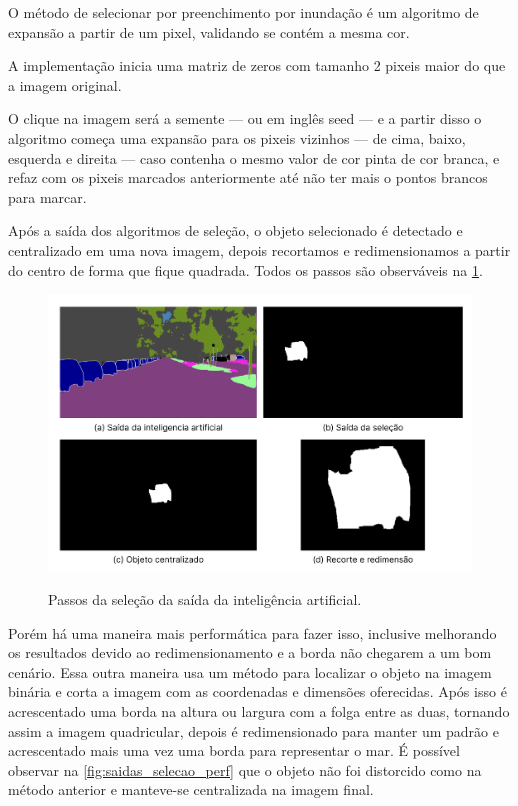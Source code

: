 O método de  selecionar por preenchimento por inundação é um algoritmo de expansão a partir de um pixel, validando se contém a mesma cor.

A implementação inicia uma matriz de zeros com tamanho 2 pixeis maior do que a imagem original.

O clique na  imagem será a semente — ou em inglês  seed — e a partir disso o algoritmo começa uma expansão para os pixeis vizinhos — de cima, baixo, esquerda e direita — caso contenha o mesmo valor de cor pinta de cor branca, e refaz com os pixeis marcados  anteriormente até não ter mais o pontos brancos para marcar.


Após a saída dos algoritmos de seleção, o objeto selecionado é detectado e centralizado em uma nova imagem, depois recortamos e redimensionamos a partir do centro de forma que fique quadrada. Todos os passos são observáveis na \cref{fig:saidas_selecao}.

\begin{figure}[!ht]
	\centering
    \caption{Passos da seleção da saída da inteligência  artificial.}
	\includegraphics[width=1.0\textwidth]{figures/saidas_selecao.png}
	\label{fig:saidas_selecao}
\end{figure}

Porém há uma maneira mais performática para fazer isso, inclusive melhorando os resultados devido ao redimensionamento e a borda não chegarem a um bom cenário. Essa outra maneira usa um método para localizar o objeto na imagem binária e corta a imagem com as coordenadas e dimensões oferecidas. Após isso é acrescentado uma borda na altura ou largura com a folga entre as duas, tornando assim a imagem quadricular, depois é redimensionado para manter um padrão e acrescentado mais uma vez uma borda para representar o mar. É possível observar na \cref{fig:saidas_selecao_perf} que o objeto não foi distorcido como na método anterior e manteve-se centralizada na imagem final.

